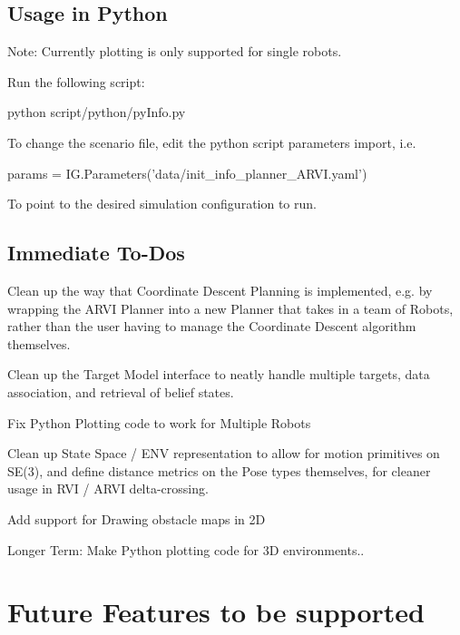 \subsection*{Usage in Python}

Note\+: Currently plotting is only supported for single robots.

Run the following script\+: \begin{DoxyVerb}python script/python/pyInfo.py
\end{DoxyVerb}


To change the scenario file, edit the python script parameters import, i.\+e. \begin{DoxyVerb}params = IG.Parameters('data/init_info_planner_ARVI.yaml')
\end{DoxyVerb}


To point to the desired simulation configuration to run.

\subsection*{Immediate To-\/\+Do\textquotesingle{}s}


\begin{DoxyItemize}
\item Clean up the way that Coordinate Descent Planning is implemented, e.\+g. by wrapping the A\+R\+VI Planner into a new Planner that takes in a team of Robots, rather than the user having to manage the Coordinate Descent algorithm themselves.
\item Clean up the Target Model interface to neatly handle multiple targets, data association, and retrieval of belief states.
\item Fix Python Plotting code to work for Multiple Robots
\item Clean up State Space / E\+NV representation to allow for motion primitives on S\+E(3), and define distance metrics on the Pose types themselves, for cleaner usage in R\+VI / A\+R\+VI delta-\/crossing.
\item Add support for Drawing obstacle maps in 2D
\item Longer Term\+: Make Python plotting code for 3D environments..
\end{DoxyItemize}

\section*{Future Features to be supported}


